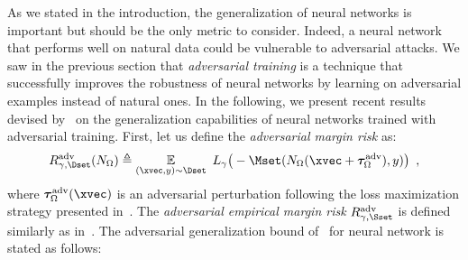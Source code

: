 As we stated in the introduction, the generalization of neural networks is important but should be the only metric to consider.
Indeed, a neural network that performs well on natural data could be vulnerable to adversarial attacks.
We saw in the previous section that \emph{adversarial training} is a technique that successfully improves the robustness of neural networks by learning on adversarial examples instead of natural ones.
In the following, we present recent results devised by~\citet{farnia2018generalizable} on the generalization capabilities of neural networks trained with adversarial training.
First, let us define the \emph{adversarial margin risk} as:
\begin{equation}
  R^{\text{adv}}_{\gamma,\Dset} (N_\Omega) \triangleq \Ebb_{(\xvec, y) \sim \Dset} \ L_\gamma \big(-\Mset(N_\Omega(\xvec + \adv^{\text{adv}}_\Omega), y) \big) \enspace,
\end{equation}
where $\adv^{\text{adv}}_\Omega(\xvec)$ is an adversarial perturbation following the loss maximization strategy presented in~.
The \emph{adversarial empirical margin risk} $R^{\text{adv}}_{\gamma,\Sset}$ is defined similarly as in~.
The adversarial generalization bound of~\citet{farnia2018generalizable} for neural network is stated as follows:
